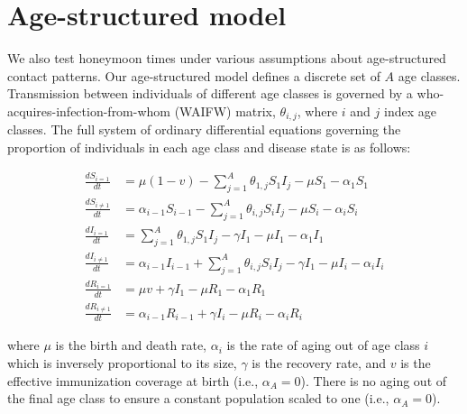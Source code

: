 \documentclass[12pt]{article}
\begin{document}
\section{Age-structured model}
\label{sec:age-structure}

We also test honeymoon times under various assumptions about age-structured contact patterns. Our age-structured model defines a discrete set of $A$ age classes.  Transmission between individuals of different age classes is governed by a who-acquires-infection-from-whom (WAIFW) matrix, $\theta_{i,j}$, where $i$ and $j$ index age classes. The full system of ordinary differential equations governing the proportion of individuals in each age class and disease state is as follows:

\begin{align}
    \frac{dS_{i=1}}{dt} &= \mu (1-v) - \sum_{j=1}^{A} \theta_{1,j} S_1 I_j - \mu S_1 - \alpha_1 S_1 \\
    \frac{dS_{i\neq1}}{dt} &= \alpha_{i-1} S_{i-1} - \sum_{j=1}^{A} \theta_{i,j} S_i I_j - \mu S_i - \alpha_i S_i \\
    \frac{dI_{i=1}}{dt} &= \sum_{j=1}^{A} \theta_{1,j} S_1 I_j - \gamma  I_1 - \mu I_1 - \alpha_1 I_1 \\
    \frac{dI_{i\neq1}}{dt} &= \alpha_{i-1} I_{i-1} + \sum_{j=1}^{A} \theta_{i,j} S_i I_j - \gamma  I_1 - \mu I_i - \alpha_i I_i \\
    \frac{dR_{i=1}}{dt} &= \mu v + \gamma I_1 - \mu R_1 - \alpha_1 R_1 \\
    \frac{dR_{i\neq1}}{dt} &= \alpha_{i-1} R_{i-1} + \gamma I_i - \mu R_i - \alpha_i R_i 
\end{align}

\noindent
where $\mu$ is the birth and death rate, $\alpha_i$ is the rate of aging out of age class $i$ which is inversely proportional to its size, $\gamma$ is the recovery rate, and $v$ is the effective immunization coverage at birth (i.e., $\alpha_A = 0$). There is no aging out of the final age class  to ensure a constant population scaled to one (i.e., $\alpha_A = 0$).
\end{document}
